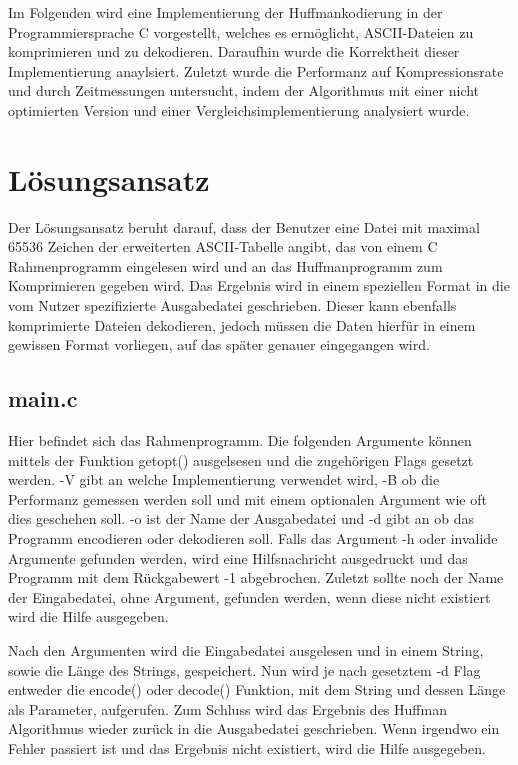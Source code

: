 \documentclass[course=erap]{aspdoc}
\begin{document}
Im Folgenden wird eine Implementierung der Huffmankodierung in der Programmiersprache C vorgestellt, welches es ermöglicht, ASCII-Dateien
zu komprimieren und zu dekodieren. Daraufhin wurde die Korrektheit  %
dieser Implementierung anaylsiert. Zuletzt wurde die Performanz auf Kompressionsrate und durch Zeitmessungen untersucht, indem der Algorithmus mit einer nicht optimierten Version und einer Vergleichsimplementierung analysiert wurde.

\section{Lösungsansatz}

Der Lösungsansatz beruht darauf, dass der Benutzer eine Datei mit maximal 65536 Zeichen der erweiterten ASCII-Tabelle angibt, das von einem C Rahmenprogramm eingelesen wird und an das Huffmanprogramm zum Komprimieren gegeben wird. Das Ergebnis wird in einem speziellen Format in die vom Nutzer spezifizierte Ausgabedatei geschrieben. Dieser kann ebenfalls komprimierte Dateien dekodieren, jedoch müssen die Daten hierfür in einem gewissen Format vorliegen, auf das später %
genauer eingegangen wird.

\subsection{main.c}

Hier befindet sich das Rahmenprogramm. Die folgenden Argumente können mittels der Funktion getopt() ausgelsesen und die zugehörigen Flags gesetzt werden.
-V gibt an welche Implementierung verwendet wird, -B ob die Performanz gemessen werden soll und mit einem optionalen Argument wie oft dies geschehen soll.
-o ist der Name der Ausgabedatei und -d gibt an ob das Programm encodieren oder dekodieren soll. Falls das Argument -h oder invalide Argumente gefunden werden, wird eine Hilfsnachricht ausgedruckt und das Programm mit dem Rückgabewert -1 abgebrochen.
Zuletzt sollte noch der Name der Eingabedatei, ohne Argument, gefunden werden, wenn diese nicht existiert wird die Hilfe ausgegeben.

Nach den Argumenten wird die Eingabedatei ausgelesen und in einem String, sowie die Länge des Strings, gespeichert. Nun wird je nach gesetztem -d Flag entweder die encode() oder decode() Funktion, mit dem String und dessen Länge als Parameter, aufgerufen.
Zum Schluss wird das Ergebnis des Huffman Algorithmus wieder zurück in die Ausgabedatei geschrieben. Wenn irgendwo ein Fehler passiert ist und das Ergebnis nicht existiert, wird die Hilfe ausgegeben.
\end{document}
